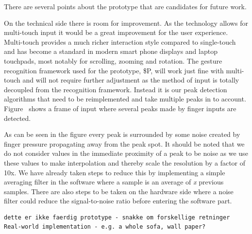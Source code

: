 There are several points about the prototype that are candidates for future work.

On the technical side there is room for improvement.
As the technology allows for multi-touch input it would be a great improvement for the user experience.
Multi-touch provides a much richer interaction style  compared to single-touch and has become a standard in modern smart phone displays and laptop touchpads, most notably for scrolling, zooming and rotation.
The gesture recognition framework used for the prototype, \$P, will work just fine with multi-touch and will not require further adjustment as the method of input is totally decoupled from the recognition framework. 
Instead it is our peak detection algorithms that need to be reimplemented and take multiple peaks in to account.
Figure~ shows a frame of input where several peaks made by finger inputs are detected. 

As can be seen in the figure every peak is surrounded by some noise created by finger pressure propagating away from the peak spot.
It should be noted that we do not consider values in the immediate proximity of a peak to be noise as we use these values to make interpolation and thereby scale the resolution by a factor of 10x.
We have already taken steps to reduce this by implementing a simple averaging filter in the software 
where a sample is an average of \emph{x} previous samples.
There are also steps to be taken on the hardware side where a noise filter could reduce the signal-to-noise ratio before entering the software part.


\begin{verbatim}
dette er ikke faerdig prototype - snakke om forskellige retninger
Real-world implementation - e.g. a whole sofa, wall paper?
\end{verbatim}

